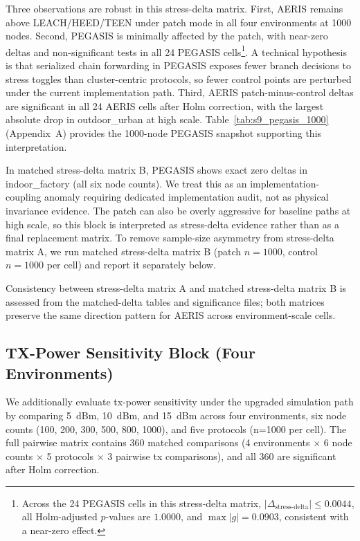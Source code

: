 ﻿\documentclass[sensors,article,submit,moreauthors,pdftex]{Definitions/mdpi}
\begin{document}
Three observations are robust in this stress-delta matrix. First, AERIS remains above LEACH/HEED/TEEN under patch mode in all four environments at 1000 nodes. Second, PEGASIS is minimally affected by the patch, with near-zero deltas and non-significant tests in all 24 PEGASIS cells\footnote{Across the 24 PEGASIS cells in this stress-delta matrix, \(|\Delta_{\text{stress-delta}}| \le 0.0044\), all Holm-adjusted \(p\)-values are \(1.0000\), and \(\max |g| = 0.0903\), consistent with a near-zero effect.}. A technical hypothesis is that serialized chain forwarding in PEGASIS exposes fewer branch decisions to stress toggles than cluster-centric protocols, so fewer control points are perturbed under the current implementation path. Third, AERIS patch-minus-control deltas are significant in all 24 AERIS cells after Holm correction, with the largest absolute drop in outdoor\_urban at high scale. Table~\ref{tab:s9_pegasis_1000} (Appendix~A) provides the 1000-node PEGASIS snapshot supporting this interpretation.

In matched stress-delta matrix B, PEGASIS shows exact zero deltas in indoor\_factory (all six node counts). We treat this as an implementation-coupling anomaly requiring dedicated implementation audit, not as physical invariance evidence. The patch can also be overly aggressive for baseline paths at high scale, so this block is interpreted as stress-delta evidence rather than as a final replacement matrix. To remove sample-size asymmetry from stress-delta matrix A, we run matched stress-delta matrix B (patch \(n=1000\), control \(n=1000\) per cell) and report it separately below.

Consistency between stress-delta matrix A and matched stress-delta matrix B is assessed from the matched-delta tables and significance files; both matrices preserve the same direction pattern for AERIS across environment-scale cells.

\subsection{TX-Power Sensitivity Block (Four Environments)}
We additionally evaluate tx-power sensitivity under the upgraded simulation path by comparing \SI{5}{dBm}, \SI{10}{dBm}, and \SI{15}{dBm} across four environments, six node counts (100, 200, 300, 500, 800, 1000), and five protocols (n=1000 per cell). The full pairwise matrix contains 360 matched comparisons (4 environments $\times$ 6 node counts $\times$ 5 protocols $\times$ 3 pairwise tx comparisons), and all 360 are significant after Holm correction.
\end{document}
